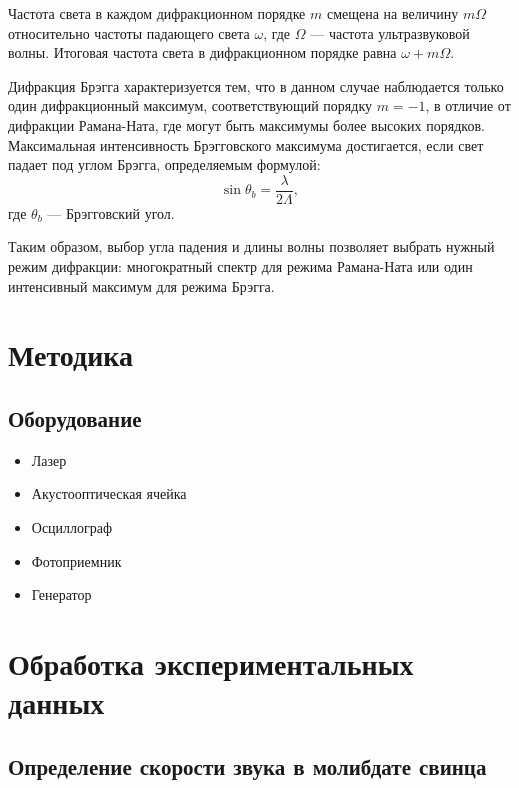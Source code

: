\documentclass[a4paper, 12pt]{extarticle}
\begin{document}
Частота света в каждом дифракционном порядке $m$ смещена на величину $m \Omega$ относительно частоты падающего света $\omega$, где $\Omega$ — частота ультразвуковой волны. Итоговая частота света в дифракционном порядке равна $\omega + m \Omega$.


Дифракция Брэгга характеризуется тем, что в данном случае наблюдается только один дифракционный максимум, соответствующий порядку $m = -1$, в отличие от дифракции Рамана-Ната, где могут быть максимумы более высоких порядков. Максимальная интенсивность Брэгговского максимума достигается, если свет падает под углом Брэгга, определяемым формулой:
\begin{equation}
    \sin \theta_b = \frac{\lambda}{2 \Lambda},
\end{equation}
где $\theta_b$ — Брэгговский угол. 

Таким образом, выбор угла падения и длины волны позволяет выбрать нужный режим дифракции: многократный спектр для режима Рамана-Ната или один интенсивный максимум для режима Брэгга.

\section*{\textcolor{header}{Методика}}

\subsection*{\textcolor{sub_header}{Оборудование}}
\begin{itemize}
    \item Лазер
    \item Акустооптическая ячейка
    \item Осциллограф
    \item Фотоприемник
    \item Генератор
\end{itemize} 

\section*{\textcolor{header}{Обработка экспериментальных данных}}
\subsection*{\textcolor{sub_header}{Определение скорости звука в молибдате свинца}}
\end{document}
